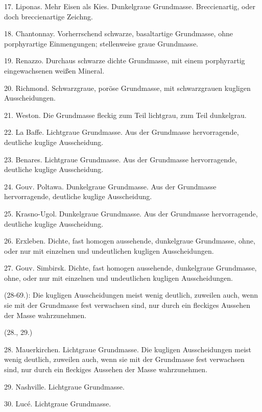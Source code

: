 \documentclass[a4paper, 11pt, oneside, polutonikogreek, german]{article}
\begin{document}
17. Liponas. Mehr Eisen als Kies. Dunkelgraue Grundmasse. Breccienartig, oder doch breccienartige Zeichng.

18. Chantonnay. Vorherrschend schwarze, basaltartige Grundmasse, ohne porphyrartige Einmengungen; stellenweise graue Grundmasse.

19. Renazzo. Durchaus schwarze dichte Grundmasse, mit einem porphyrartig eingewachsenen weißen Mineral.

20. Richmond. Schwarzgraue, poröse Grundmasse, mit schwarzgrauen kugligen Ausscheidungen.

21. Weston. Die Grundmasse fleckig zum Teil lichtgrau, zum Teil dunkelgrau.

22. La Baffe. Lichtgraue Grundmasse. Aus der Grundmasse hervorragende, deutliche kuglige Ausscheidung.

23. Benares. Lichtgraue Grundmasse. Aus der Grundmasse hervorragende, deutliche kuglige Ausscheidung.

24. Gouv. Poltawa. Dunkelgraue Grundmasse. Aus der Grundmasse hervorragende, deutliche kuglige Ausscheidung. 

25. Krasno-Ugol. Dunkelgraue Grundmasse. Aus der Grundmasse hervorragende, deutliche kuglige Ausscheidung.

26. Erxleben. Dichte, fast homogen aussehende, dunkelgraue Grundmasse, ohne, oder nur mit einzelnen und undeutlichen kugligen Ausscheidungen.

27. Gouv. Simbirsk. Dichte, fast homogen aussehende, dunkelgraue Grundmasse, ohne, oder nur mit einzelnen und undeutlichen kugligen Ausscheidungen.

\vspace{2ex}

(28-69.): Die kugligen Ausscheidungen meist wenig deutlich, zuweilen auch, wenn sie mit der Grundmasse fest verwachsen sind, nur durch ein fleckiges Aussehen der Masse wahrzunehmen.
\begin{center}
(28., 29.)
\end{center}
\hspace*{6mm}28. Mauerkirchen. Lichtgraue Grundmasse. Die kugligen Ausscheidungen meist wenig deutlich, zuweilen auch, wenn sie mit der Grundmasse fest verwachsen sind, nur durch ein fleckiges Aussehen der Masse wahrzunehmen.

29. Nashville. Lichtgraue Grundmasse.

\vspace{2ex}

30. Lucé. Lichtgraue Grundmasse.
\end{document}
